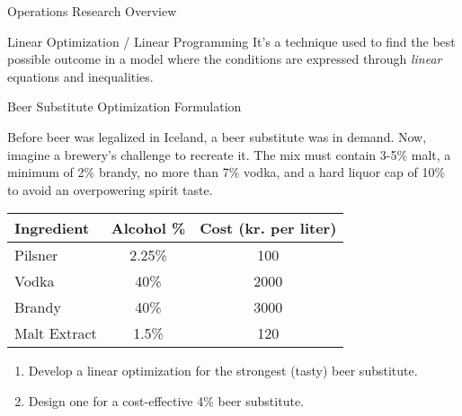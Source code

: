 \documentclass[
    NAME={Dr. Helga Ingimundardóttir},
    EMAIL={helgaingim@hi.is},
    FACULTY={Industrial Engineering},
    TITLE={Linear Optimization},
    SUBTITLE={Fundamentals and Applications},
    SEMINAR={VÉL113F},
    DATE={Design and Optimization}
]{HI-latex/hi-beamer}
\begin{document}
\begin{frame}[allowframebreaks]{Operations Research Overview}
        \begin{block}{Linear Optimization / Linear Programming}
            It's a technique used to find the best possible outcome in a model where the conditions are expressed through
            \emph{linear} equations and inequalities.
        \end{block}

    \end{frame}

    \begin{frame}[allowframebreaks]{Beer Substitute Optimization Formulation}
        \label{example:beer:model}
        \begin{example}
            Before beer was legalized in Iceland, a beer substitute was in demand. Now, imagine a brewery's challenge to recreate
            it. The mix must contain 3-5\% malt, a minimum of 2\% brandy, no more than 7\% vodka, and a hard liquor cap of 10\% to
            avoid an overpowering spirit taste.

            \begin{table}[h]
                \centering
                \scriptsize
                \begin{tabular}{|l|c|c|}
                    \hline
                    \textbf{Ingredient} & \textbf{Alcohol \%} & \textbf{Cost (kr. per liter)} \\
                    \hline
                    Pilsner             & 2.25\%              & 100                           \\
                    Vodka               & 40\%                & 2000                          \\
                    Brandy              & 40\%                & 3000                          \\
                    Malt Extract        & 1.5\%               & 120                           \\
                    \hline
                \end{tabular}
            \end{table}

            \begin{enumerate}
                \item Develop a linear optimization for the strongest (tasty) beer substitute.
                \item Design one for a cost-effective 4\% beer substitute.
            \end{enumerate}
        \end{example}
    \end{frame}
\end{document}

